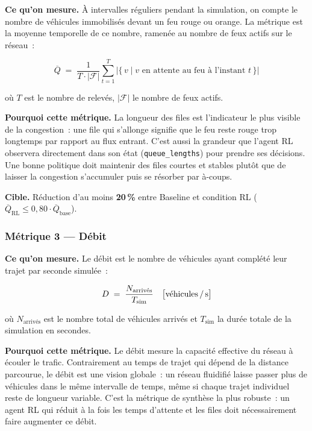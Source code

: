 \documentclass[a4paper,10pt]{article}
\begin{document}
\textbf{Ce qu'on mesure.}
\`{A} intervalles r\'{e}guliers pendant la simulation, on compte le nombre de
v\'{e}hicules immobilis\'{e}s devant un feu rouge ou orange.
La m\'{e}trique est la moyenne temporelle de ce nombre, ramen\'{e}e
au nombre de feux actifs sur le r\'{e}seau~:

\[
  \overline{Q}
  \;=\;
  \frac{1}{T \cdot |\mathcal{F}|}
  \sum_{t=1}^{T}
  \bigl|\{\, v \mid v \text{ en attente au feu \`{a} l'instant } t \,\}\bigr|
\]

o\`{u} $T$ est le nombre de relevés, $|\mathcal{F}|$ le nombre de feux actifs.

\textbf{Pourquoi cette m\'{e}trique.}
La longueur des files est l'indicateur le plus visible de la congestion~:
une file qui s'allonge signifie que le feu reste rouge trop longtemps
par rapport au flux entrant.
C'est aussi la grandeur que l'agent RL observera directement dans son
\'{e}tat (\texttt{queue\_lengths}) pour prendre ses d\'{e}cisions.
Une bonne politique doit maintenir des files courtes et stables plut\^{o}t
que de laisser la congestion s'accumuler puis se r\'{e}sorber par \`{a}-coups.

\textbf{Cible.} R\'{e}duction d'au moins \textbf{20\,\%}
entre Baseline et condition RL ($\overline{Q}_{\text{RL}} \leq 0{,}80 \cdot \overline{Q}_{\text{base}}$).

\subsubsection*{M\'{e}trique 3 --- D\'{e}bit}

\textbf{Ce qu'on mesure.}
Le d\'{e}bit est le nombre de v\'{e}hicules ayant compl\'{e}t\'{e} leur trajet
par seconde simul\'{e}e~:

\[
  D
  \;=\;
  \frac{N_{\text{arriv\'{e}s}}}{T_{\text{sim}}}
  \quad \bigl[\text{v\'{e}hicules\,/\,s}\bigr]
\]

o\`{u} $N_{\text{arriv\'{e}s}}$ est le nombre total de v\'{e}hicules arriv\'{e}s
et $T_{\text{sim}}$ la dur\'{e}e totale de la simulation en secondes.

\textbf{Pourquoi cette m\'{e}trique.}
Le d\'{e}bit mesure la capacit\'{e} effective du r\'{e}seau \`{a} \'{e}couler le trafic.
Contrairement au temps de trajet qui d\'{e}pend de la distance parcourue,
le d\'{e}bit est une vision globale~: un r\'{e}seau fluidifi\'{e} laisse passer
plus de v\'{e}hicules dans le m\^{e}me intervalle de temps,
m\^{e}me si chaque trajet individuel reste de longueur variable.
C'est la m\'{e}trique de synth\`{e}se la plus robuste~: un agent RL
qui r\'{e}duit \`{a} la fois les temps d'attente et les files
doit n\'{e}cessairement faire augmenter ce d\'{e}bit.
\end{document}
